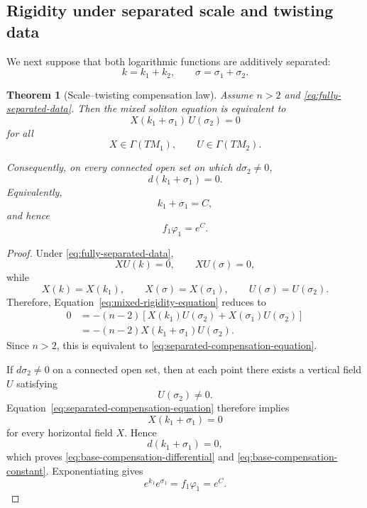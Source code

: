 \documentclass[a4paper,11pt]{article}
\theoremstyle{plain}
\newtheorem{theorem}{Theorem}[section]
\numberwithin{equation}{section}
\begin{document}
\subsection{Rigidity under separated scale and twisting data}
\label{subsec:separated-rigidity}

We next suppose that both logarithmic functions are additively
separated:
\begin{equation}
	k=k_{1}+k_{2},
	\qquad
	\sigma=\sigma_{1}+\sigma_{2}.
	\label{eq:fully-separated-data}
\end{equation}

\begin{theorem}[Scale--twisting compensation law]
	\label{thm:scale-twisting-compensation-law}
	Assume \(n>2\) and
	\eqref{eq:fully-separated-data}. Then the mixed soliton
	equation is equivalent to
	\begin{equation}
		X(k_{1}+\sigma_{1})\,U(\sigma_{2})
		=
		0
		\label{eq:separated-compensation-equation}
	\end{equation}
	for all
	\[
	X\in\Gamma(TM_{1}),
	\qquad
	U\in\Gamma(TM_{2}).
	\]
	
	Consequently, on every connected open set on which
	\(d\sigma_{2}\neq0\),
	\begin{equation}
		d(k_{1}+\sigma_{1})=0.
		\label{eq:base-compensation-differential}
	\end{equation}
	Equivalently,
	\begin{equation}
		k_{1}+\sigma_{1}
		=
		C,
		\label{eq:base-compensation-constant}
	\end{equation}
	and hence
	\begin{equation}
		f_{1}\varphi_{1}
		=
		e^{C}.
		\label{eq:scale-twisting-product-constant}
	\end{equation}
\end{theorem}

\begin{proof}
	Under \eqref{eq:fully-separated-data},
	\[
	XU(k)=0,
	\qquad
	XU(\sigma)=0,
	\]
	while
	\[
	X(k)=X(k_{1}),
	\qquad
	X(\sigma)=X(\sigma_{1}),
	\qquad
	U(\sigma)=U(\sigma_{2}).
	\]
	Therefore, Equation~\eqref{eq:mixed-rigidity-equation} reduces
	to
	\begin{align*}
		0
		&=
		-(n-2)
		\left[
		X(k_{1})U(\sigma_{2})
		+
		X(\sigma_{1})U(\sigma_{2})
		\right]
		\\
		&=
		-(n-2)
		X(k_{1}+\sigma_{1})U(\sigma_{2}).
	\end{align*}
	Since \(n>2\), this is equivalent to
	\eqref{eq:separated-compensation-equation}.
	
	If \(d\sigma_{2}\neq0\) on a connected open set, then at each
	point there exists a vertical field \(U\) satisfying
	\[
	U(\sigma_{2})\neq0.
	\]
	Equation~\eqref{eq:separated-compensation-equation} therefore
	implies
	\[
	X(k_{1}+\sigma_{1})=0
	\]
	for every horizontal field \(X\). Hence
	\[
	d(k_{1}+\sigma_{1})=0,
	\]
	which proves \eqref{eq:base-compensation-differential} and
	\eqref{eq:base-compensation-constant}. Exponentiating gives
	\[
	e^{k_{1}}e^{\sigma_{1}}
	=
	f_{1}\varphi_{1}
	=
	e^{C}.
	\]
\end{proof}
\end{document}

